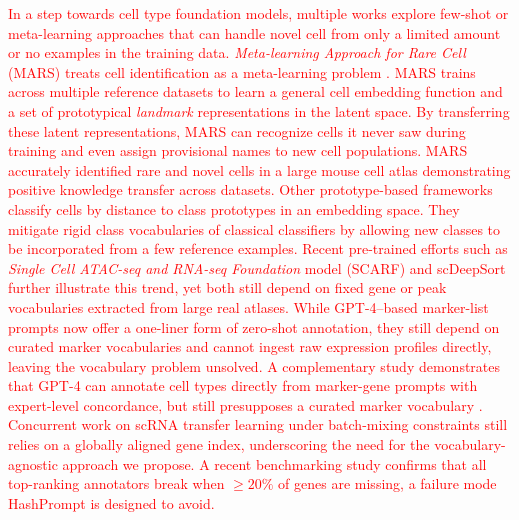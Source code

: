 \documentclass{article}
\newcommand{\gpt}[1]{\textcolor{red}{#1}}
\begin{document}
\gpt{
In a step towards cell type foundation models, multiple works explore few-shot or meta-learning approaches that can handle novel cell   from only a limited amount or no examples in the training data. \textit{Meta-learning Approach for Rare Cell  } (MARS) treats cell identification as a meta-learning problem \cite{brbic2020mars}. MARS trains across multiple reference datasets to learn a general cell embedding function and a set of prototypical \textit{landmark} representations in the latent space. By transferring these latent representations, MARS can recognize cells it never saw during training and even assign provisional names to new cell populations. MARS accurately identified rare and novel cells in a large mouse cell atlas demonstrating positive knowledge transfer across datasets. Other prototype-based frameworks \cite{snell2017prototypical} classify cells by distance to class prototypes in an embedding space. They mitigate rigid class vocabularies of classical classifiers by allowing new classes to be incorporated from a few reference examples.
Recent pre-trained efforts such as \textit{Single Cell ATAC-seq and RNA-seq Foundation} model (SCARF) \cite{liu2025scarf} and scDeepSort \cite{shao2021scdeepsort} further illustrate this trend, yet both still depend on fixed gene or peak vocabularies extracted from large real atlases. While GPT-4--based marker-list prompts now offer a one-liner form of zero-shot annotation, they still depend on curated marker vocabularies and cannot ingest raw expression profiles directly, leaving the vocabulary problem unsolved. A complementary study demonstrates that GPT-4 can annotate cell types directly from marker-gene prompts with expert-level concordance, but still presupposes a curated marker vocabulary \cite{hou2024assessing}.
Concurrent work on scRNA transfer learning under batch-mixing constraints \cite{yang2025mixmatch} still relies on a globally aligned gene index, underscoring the need for the vocabulary-agnostic approach we propose. A recent benchmarking study \cite{smith2024benchmark} confirms that all top-ranking annotators break when $\geq20\%$ of genes are missing, a failure mode HashPrompt is designed to avoid.
}
\end{document}
